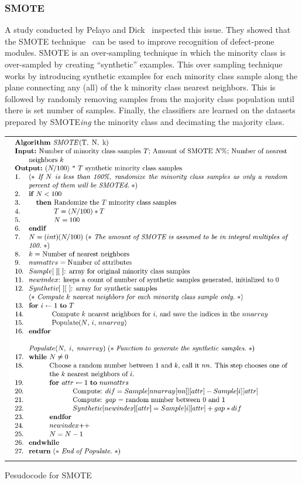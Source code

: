 \documentclass[12pt]{IEEEtran}
\begin{document}
\subsubsection*{{SMOTE}}
A study conducted by Pelayo and Dick~\cite{smote2} inspected this issue. They showed that the SMOTE technique~\cite{smote} can be used to improve recognition of defect-prone modules. SMOTE is an over-sampling technique in which the minority class is over-sampled by creating “synthetic” examples. This over sampling technique works by introducing synthetic examples for each minority class sample along the plane connecting any (all) of the k minority class nearest neighbors. This is followed by randomly removing samples from the majority class population until there is set number of samples. Finally, the classifiers are learned on the datasets prepared by SMOTE\textit{ing} the minority class and decimating the majority class.

\begin{algorithm}[bt!]
	 \begin{tabular}{p{0.99\linewidth}}
  \includegraphics[width=\linewidth]{SMOTE_pseudocode.jpg}
  \end{tabular}
  \caption{Pesudocode for SMOTE}
  \label{alg:smote}
\end{algorithm}
\end{document}
